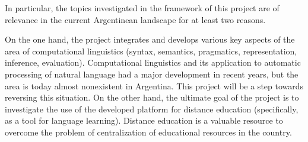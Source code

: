In particular, the topics investigated in the framework of this project are of
relevance in the current Argentinean landscape for at least two reasons.

On the one hand, the project integrates and develops various key aspects of the
area of computational linguistics (syntax, semantics, pragmatics,
representation, inference, evaluation). Computational linguistics
and its application to automatic processing of natural language had a major
development in recent years, but the area is today almost 
nonexistent in Argentina. This project will be a step towards reversing this situation. 
On the other hand, the ultimate goal of the project is to investigate
the use of the 
developed platform for distance education (specifically, as a tool for
language learning). Distance education is a valuable resource to overcome the problem of
centralization of educational resources in the country. 
